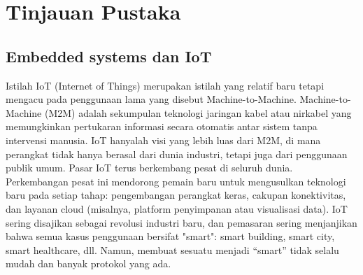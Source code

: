 \chapter{Tinjauan Pustaka}
\section{Embedded systems dan IoT}
Istilah IoT (Internet of Things) merupakan istilah yang relatif baru tetapi mengacu pada penggunaan lama yang disebut Machine-to-Machine.
Machine-to-Machine (M2M) adalah sekumpulan teknologi jaringan kabel atau nirkabel yang memungkinkan pertukaran informasi secara otomatis antar sistem tanpa intervensi manusia. IoT hanyalah visi yang lebih luas dari M2M, di mana perangkat tidak hanya berasal dari dunia industri, tetapi juga dari penggunaan publik umum.
Pasar IoT terus berkembang pesat di seluruh dunia. Perkembangan pesat ini mendorong pemain baru untuk mengusulkan teknologi baru pada setiap tahap: pengembangan perangkat keras, cakupan konektivitas, dan layanan cloud (misalnya, platform penyimpanan atau visualisasi data).
IoT sering disajikan sebagai revolusi industri baru, dan pemasaran sering menjanjikan bahwa semua kasus penggunaan bersifat "smart": smart building, smart city, smart healthcare, dll. Namun, membuat sesuatu menjadi “smart” tidak selalu mudah dan banyak protokol yang ada.
